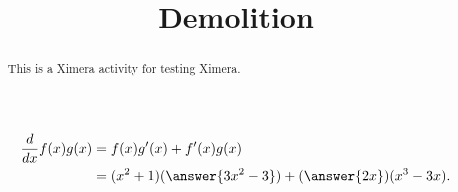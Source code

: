 \documentclass{ximera}
\title{Demolition}
\newcommand{\ddx}{\frac{d}{dx}}
\begin{document}

\begin{abstract} %
  This is a Ximera activity for testing Ximera.
\end{abstract}
\maketitle

\begin{align*}
\ddx f(x)g(x) &= f(x)g'(x) + f'(x)g(x)\\
&=(x^2+1)(\answer{3x^2-3}) + (\answer{2x})(x^3-3x).
\end{align*}

\end{document}
